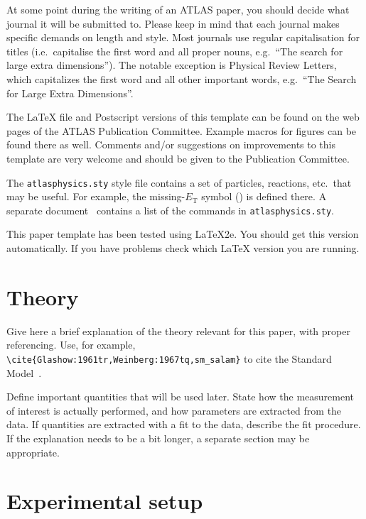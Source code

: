 \documentclass[UKenglish]{style/atlasdoc}
\begin{document}
At some point during the writing of an ATLAS paper, 
you should decide what journal it will be submitted to.
Please keep in mind that each journal makes specific demands on length and style.
Most journals use regular capitalisation for titles 
(i.e.\ capitalise the first word and all proper nouns, 
e.g.\ ``The search for large extra dimensions''). 
The notable exception is Physical Review Letters, which capitalizes the
first word and all other important words,
e.g.\ ``The Search for Large Extra Dimensions''.

The \LaTeX{} file and Postscript versions of this template can be
found on the web pages of the ATLAS Publication Committee. Example
macros for figures can be found there as well.  Comments and/or
suggestions on improvements to this template are very welcome and
should be given to the Publication Committee.

The \texttt{atlasphysics.sty} style file contains a set of particles,
reactions, etc.\ that may be useful. For example, the missing-$E_{\text{T}}$
symbol (\met{}) is defined there. 
A separate document~\cite{atlas-physics}
contains a list of the commands in \texttt{atlasphysics.sty}.

This paper template has been tested using \LaTeX{}2e.  You should get
this version automatically. If you have problems check which \LaTeX{}
version you are running.


\section{Theory}
\label{sec:theory}

Give here a brief explanation of the theory relevant for this paper,
with proper referencing. Use, for example,
\verb|\cite{Glashow:1961tr,Weinberg:1967tq,sm_salam}| to cite the
Standard Model~\cite{Glashow:1961tr,Weinberg:1967tq,sm_salam}.

Define important quantities that will be used later.
State how the measurement of interest is actually performed, and how parameters are
extracted from the data.  
If quantities are extracted with a fit to the data, describe the fit procedure.
If the explanation needs to be a bit longer, a separate section may be appropriate.


\section{Experimental setup}
\label{sec:atlas}
\end{document}
